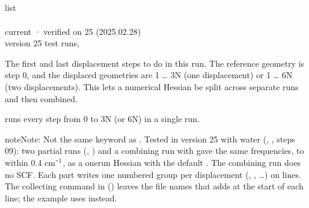 \documentclass[letterpaper,10pt,english,openany,oneside]{sphinxmanual}
\begin{document}
\subsection{}
\label{\detokenize{reference/d2edr2:steps}}\label{\detokenize{reference/d2edr2:d2edr2-steps}}
\ignorespaces 
\sphinxAtStartPar
{} list\\
 \\
 current · verified on 25 (2025.02.28)\\
 version 25 test runs, 

\sphinxAtStartPar
The first and last displacement steps to do in this run. The reference geometry is step 0, and the displaced
geometries are 1 … 3N (one displacement) or 1 … 6N (two displacements). This lets a numerical Hessian be split
across separate runs and then combined.

\sphinxAtStartPar
{}  runs every step from 0 to 3N (or 6N) in a single run.

\begin{sphinxadmonition}{note}{Note:}
\sphinxAtStartPar
Not the same keyword as . Tested in version 25 with water (, , steps 0\textendash{}9):
two partial runs (, ) and a combining run with  gave the same
frequencies, to within 0.4 cm⁻\(\sp{\text{1}}\), as a one\sphinxhyphen{}run Hessian with the default . The combining run does no
SCF. Each part writes one numbered group per displacement (, , …) on  lines. The collecting command in 
() leaves the file names that  adds at the start of each line;
the example uses  instead.
\end{sphinxadmonition}
\end{document}
